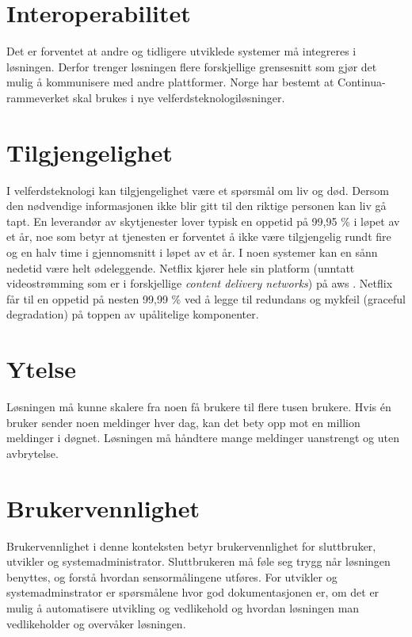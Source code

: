 \section{Interoperabilitet}
Det er forventet at andre og tidligere utviklede systemer må integreres i løsningen. Derfor trenger løsningen flere forskjellige
grensesnitt som gjør det mulig å kommunisere med andre plattformer.
Norge har bestemt at Continua-rammeverket skal brukes i nye
velferdsteknologiløsninger.

\section{Tilgjengelighet}
I velferdsteknologi kan tilgjengelighet være et spørsmål om liv og død. Dersom den nødvendige informasjonen ikke blir gitt til den
riktige personen kan liv gå tapt. En leverandør av skytjenester lover typisk en oppetid på 99,95 \% i løpet av et år,
noe som betyr at tjenesten er forventet å ikke være tilgjengelig rundt fire og en halv time
i gjennomsnitt i løpet av et år. I noen systemer kan en sånn nedetid være helt ødeleggende.
Netflix kjører hele sin platform (unntatt videostrømming som er i forskjellige
\textit{content delivery networks}) på \gls{aws} \citep{netflix_aws}. Netflix får til en oppetid
på nesten 99,99 \% ved å legge til redundans og mykfeil (graceful degradation) på toppen av
upålitelige komponenter.

\section{Ytelse}
Løsningen må kunne skalere fra noen få brukere til flere tusen brukere. Hvis én bruker sender noen meldinger hver dag, kan det
bety opp mot en million meldinger i døgnet. Løsningen må håndtere mange meldinger uanstrengt og uten avbrytelse.

\section{Brukervennlighet}
Brukervennlighet i denne konteksten betyr brukervennlighet for sluttbruker, utvikler og systemadministrator.
Sluttbrukeren må føle seg trygg når løsningen benyttes, og forstå hvordan sensormålingene utføres.
For utvikler og systemadminstrator er spørsmålene hvor god dokumentasjonen er, om det er mulig å automatisere
utvikling og vedlikehold og hvordan løsningen man vedlikeholder og overvåker løsningen.

